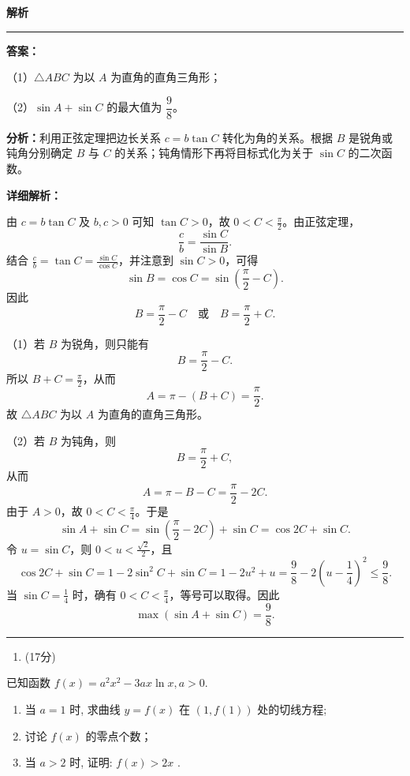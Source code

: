 \documentclass[UTF8,12pt,a4paper]{ctexart}
\renewcommand{\labelenumi}{\arabic{enumi}.}
\newenvironment{examSolutionBox}{%
  \par\medskip\begingroup
  \setlength{\leftskip}{1.0em}\setlength{\rightskip}{0.9em}%
  \noindent\textcolor{SolutionTeal}{\bfseries\large 解析}\par
  \smallskip\noindent\textcolor{SolutionRule}{\rule{\dimexpr\linewidth-\leftskip-\rightskip\relax}{0.8pt}}\par
  \smallskip\color{SolutionInk}%
}{%
  \par\smallskip\noindent\textcolor{SolutionRule}{\rule{\dimexpr\linewidth-\leftskip-\rightskip\relax}{0.8pt}}\par
  \endgroup\medskip
}
\providecommand{\tightlist}{%
  \setlength{\itemsep}{0pt}\setlength{\parskip}{0pt}}
\begin{document}
\begin{examSolutionBox}

\textbf{答案：}
\par\smallskip\noindent（1）\(\triangle ABC\) 为以 \(A\) 为直角的直角三角形；
\par\smallskip\noindent（2）\(\sin A+\sin C\) 的最大值为 \(\dfrac98\)。

\textbf{分析：}利用正弦定理把边长关系 \(c=b\tan C\) 转化为角的关系。根据 \(B\) 是锐角或钝角分别确定 \(B\) 与 \(C\) 的关系；钝角情形下再将目标式化为关于 \(\sin C\) 的二次函数。

\textbf{详细解析：}

由 \(c=b\tan C\) 及 \(b,c>0\) 可知 \(\tan C>0\)，故 \(0<C<\frac{\pi}{2}\)。由正弦定理，
\[
   \frac cb=\frac{\sin C}{\sin B}.
   \]
结合 \(\frac cb=\tan C=\frac{\sin C}{\cos C}\)，并注意到 \(\sin C>0\)，可得
\[
   \sin B=\cos C=\sin\left(\frac{\pi}{2}-C\right).
   \]
因此
\[
   B=\frac{\pi}{2}-C
   \quad\text{或}\quad
   B=\frac{\pi}{2}+C.
   \]


\par\smallskip\noindent（1）若 \(B\) 为锐角，则只能有
\[
   B=\frac{\pi}{2}-C.
   \]
所以 \(B+C=\frac{\pi}{2}\)，从而
\[
   A=\pi-(B+C)=\frac{\pi}{2}.
   \]
故 \(\triangle ABC\) 为以 \(A\) 为直角的直角三角形。


\par\smallskip\noindent（2）若 \(B\) 为钝角，则
\[
   B=\frac{\pi}{2}+C,
   \]
从而
\[
   A=\pi-B-C=\frac{\pi}{2}-2C.
   \]
由于 \(A>0\)，故 \(0<C<\frac{\pi}{4}\)。于是
\[
   \sin A+\sin C
   =\sin\left(\frac{\pi}{2}-2C\right)+\sin C
   =\cos 2C+\sin C.
   \]
令 \(u=\sin C\)，则 \(0<u<\frac{\sqrt2}{2}\)，且
\[
   \cos 2C+\sin C
   =1-2\sin^2C+\sin C
   =1-2u^2+u
   =\frac98-2\left(u-\frac14\right)^2
   \leqslant \frac98.
   \]
当 \(\sin C=\frac14\) 时，确有 \(0<C<\frac{\pi}{4}\)，等号可以取得。因此
\[
   \boxed{\max(\sin A+\sin C)=\frac98}.
   \]

\end{examSolutionBox}

\begin{enumerate}
\def\labelenumi{\arabic{enumi}.}
\setcounter{enumi}{17}
\tightlist
\item
  (17分)
\end{enumerate}

已知函数 \(f(x)=a^{2}x^{2}-3ax\ln x,a>0.\)

\begin{enumerate}
\def\labelenumi{(\arabic{enumi})}
\item
  当 \(a = 1\) 时, 求曲线 \(y = f(x)\) 在 \((1, f(1))\) 处的切线方程;
\item
  讨论 \(f(x)\) 的零点个数；
\item
  当 \(a > 2\) 时, 证明: \(f(x) > 2x\) .
\end{enumerate}
\end{document}

